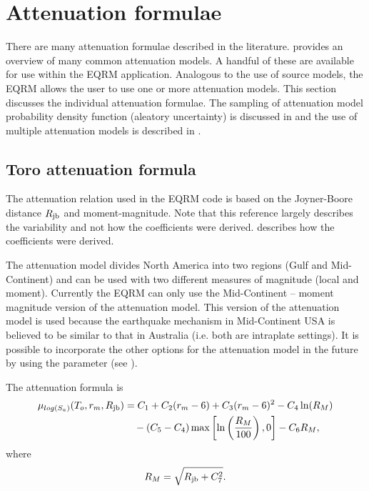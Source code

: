 \section{Attenuation formulae}
\label{attn:atten-formula}


There are many attenuation formulae described in the literature.
\citet{dr_Campbell03a} provides an overview of many common
attenuation models. A handful of these are available for use
within the EQRM application. Analogous to the use of source
models, the EQRM allows the user to use one or more attenuation
models. This section discusses the individual attenuation
formulae. The sampling of attenuation model probability density
function (aleatory uncertainty) is discussed in
 and the use of multiple attenuation models
is described in .


\subsection{Toro attenuation formula}

The \citet{dr_Toro97a} attenuation relation used in the EQRM code
is based on the Joyner-Boore distance $\Rjb$ and moment-magnitude.
Note that this reference largely describes the variability and not
how the coefficients were derived. \citet{dr_EPRI93a} describes
how the coefficients were derived.

The \citet{dr_Toro97a} attenuation model divides North America
into two regions (Gulf and Mid-Continent) and can  be used with
two different measures of magnitude (local and moment). Currently
the EQRM can only use the Mid-Continent -- moment magnitude
version of the attenuation model. This version of the attenuation
model is used because the earthquake mechanism in Mid-Continent
USA is believed to be similar to that in Australia (i.e. both are
intraplate settings). It is possible to incorporate the other
options for the \cite{dr_Toro97a} attenuation model in the future
by using the  parameter
 (see ).

The attenuation formula is
\begin{equation}
\begin{split}
\mu_{log(S_a)}(T_o,r_m,\Rjb) &= C_1 + C_2(r_m-6) + C_3(r_m-6)^2 - C_4\ln(R_M) \\
       &\quad  - (C_5-C_4)\max\left[\ln\left(\frac{R_M}{100}\right),0\right] -C_6R_M,
\end{split}
\end{equation}
where
\begin{equation}
 R_M = \sqrt{ \Rjb + C_7^2 }.
\end{equation}

